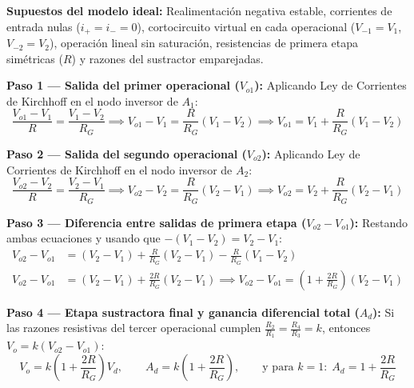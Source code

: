 \documentclass[10pt, a4paper]{article}
\begin{document}
\textbf{Supuestos del modelo ideal:} Realimentación negativa estable, corrientes de entrada nulas ($i_+ = i_- = 0$), cortocircuito virtual en cada operacional ($V_{-1}=V_1$, $V_{-2}=V_2$), operación lineal sin saturación, resistencias de primera etapa simétricas ($R$) y razones del sustractor emparejadas.

\textbf{Paso 1 — Salida del primer operacional ($V_{o1}$):} Aplicando Ley de Corrientes de Kirchhoff en el nodo inversor de $A_1$:
\begin{equation}
    \frac{V_{o1} - V_1}{R} = \frac{V_1 - V_2}{R_G} \implies V_{o1} - V_1 = \frac{R}{R_G}(V_1 - V_2) \implies \boxed{V_{o1} = V_1 + \frac{R}{R_G}(V_1 - V_2)}
\end{equation}

\textbf{Paso 2 — Salida del segundo operacional ($V_{o2}$):} Aplicando Ley de Corrientes de Kirchhoff en el nodo inversor de $A_2$:
\begin{equation}
    \frac{V_{o2} - V_2}{R} = \frac{V_2 - V_1}{R_G} \implies V_{o2} - V_2 = \frac{R}{R_G}(V_2 - V_1) \implies \boxed{V_{o2} = V_2 + \frac{R}{R_G}(V_2 - V_1)}
\end{equation}

\textbf{Paso 3 — Diferencia entre salidas de primera etapa ($V_{o2} - V_{o1}$):} Restando ambas ecuaciones y usando que $-(V_1 - V_2) = V_2 - V_1$:
\begin{align}
    V_{o2} - V_{o1} &= (V_2 - V_1) + \frac{R}{R_G}(V_2 - V_1) - \frac{R}{R_G}(V_1 - V_2) \nonumber \\
    V_{o2} - V_{o1} &= (V_2 - V_1) + \frac{2R}{R_G}(V_2 - V_1) \implies \boxed{V_{o2} - V_{o1} = \left(1 + \frac{2R}{R_G}\right)(V_2 - V_1)}
\end{align}

\textbf{Paso 4 — Etapa sustractora final y ganancia diferencial total ($A_d$):} Si las razones resistivas del tercer operacional cumplen $\frac{R_2}{R_1} = \frac{R_4}{R_3} = k$, entonces $V_o = k(V_{o2} - V_{o1})$:
\begin{equation}
    \boxed{V_o = k\left(1 + \frac{2R}{R_G}\right)V_d}, \qquad \boxed{A_d = k\left(1 + \frac{2R}{R_G}\right)}, \qquad \text{y para } k=1:\; \boxed{A_d = 1 + \frac{2R}{R_G}}
\end{equation}
\end{document}

